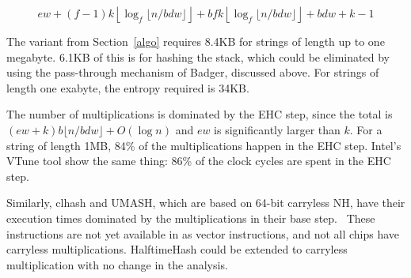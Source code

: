 \documentclass[runningheads]{llncs}
\begin{document}
\[
e w
+ (f-1) k \left\lfloor\log_f \lfloor n/b d w\rfloor\right\rfloor
+ b f k \left\lfloor\log_f \lfloor n/b d w\rfloor\right\rfloor
+ b d w + k - 1
\]

The variant from Section~\ref{algo} requires 8.4KB for strings of length up to one megabyte.
6.1KB of this is for hashing the stack, which could be eliminated by using the pass-through mechanism of Badger, discussed above.
For strings of length one exabyte, the entropy required is 34KB.

The number of multiplications is dominated by the EHC step, since the total is $(e w + k) b \lfloor n / b d w \rfloor + O(\log n)$ and $e w$ is significantly larger than $k$.
For a string of length 1MB, 84\% of the multiplications happen in the EHC step. %
Intel's VTune tool show the same thing: 86\% of the clock cycles are spent in the EHC step.

Similarly, clhash and UMASH, which are based on 64-bit carryless NH, have their execution times dominated by the multiplications in their base step.~\cite{clhash,umash}
These instructions are not yet available in as vector instructions, and not all chips have carryless multiplications.
HalftimeHash could be extended to carryless multiplication with no change in the analysis.






\end{document}
